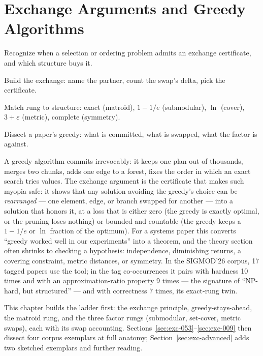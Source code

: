 \chapter{Exchange Arguments and Greedy Algorithms}
\setcounter{section}{-1}   %
\label{ch:exc}

\begin{objectives}
\item Recognize when a selection or ordering problem admits an exchange certificate,
  and which structure buys it.
\item Build the exchange: name the partner, count the swap's delta, pick the
  certificate.
\item Match rung to structure: exact (matroid), $1-1/e$ (submodular), $\ln$
  (cover), $3+\varepsilon$ (metric), complete (symmetry).
\item Dissect a paper's greedy: what is committed, what is swapped, what the factor
  is against.
\end{objectives}

A greedy algorithm commits irrevocably: it keeps one plan out of thousands, merges two
chunks, adds one edge to a forest, fixes the order in which an exact search tries
values. The exchange argument is the certificate that makes such myopia safe: it shows
that any solution avoiding the greedy's choice can be \emph{rearranged} --- one
element, edge, or branch swapped for another --- into a solution that honors it, at a
loss that is either zero (the greedy is exactly optimal, or the pruning loses nothing)
or bounded and countable (the greedy keeps a $1-1/e$ or $\ln$ fraction of the optimum).
For a systems paper this converts ``greedy worked well in our experiments'' into a
theorem, and the theory section often shrinks to checking a hypothesis: independence,
diminishing returns, a covering constraint, metric distances, or symmetry. In the
SIGMOD'26 corpus, 17 tagged papers use the tool; in the tag co-occurrences it pairs
with hardness 10 times and with an approximation-ratio property 9 times --- the
signature of ``NP-hard, but structured'' --- and with correctness 7 times, its
exact-rung twin.

This chapter builds the ladder first: the exchange principle, greedy-stays-ahead, the
matroid rung, and the three factor rungs (submodular, set-cover, metric swaps), each
with its swap accounting. Sections~\ref{sec:exc-053}--\ref{sec:exc-009} then dissect
four corpus exemplars at full anatomy; Section~\ref{sec:exc-advanced} adds two
sketched exemplars and further reading.

